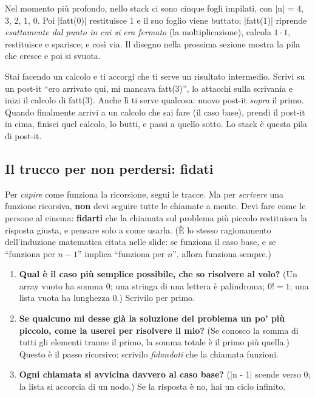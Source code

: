 Nel momento più profondo, nello stack ci sono cinque fogli impilati, con
\cc|n| = 4, 3, 2, 1, 0. Poi \cc|fatt(0)| restituisce 1 e il suo foglio viene
buttato; \cc|fatt(1)| riprende \emph{esattamente dal punto in cui si era fermato}
(la moltiplicazione), calcola $1 \cdot 1$, restituisce e sparisce; e così via. Il
disegno nella prossima sezione mostra la pila che cresce e poi si svuota.

\begin{analogia}
Stai facendo un calcolo e ti accorgi che ti serve un risultato intermedio. Scrivi
su un post-it ``ero arrivato qui, mi mancava fatt(3)'', lo attacchi sulla
scrivania e inizi il calcolo di fatt(3). Anche lì ti serve qualcosa: nuovo post-it
\emph{sopra} il primo. Quando finalmente arrivi a un calcolo che sai fare (il caso
base), prendi il post-it in cima, finisci quel calcolo, lo butti, e passi a quello
sotto. Lo stack è questa pila di post-it.
\end{analogia}

\subsection*{Il trucco per non perdersi: fidati}

Per \emph{capire} come funziona la ricorsione, segui le tracce. Ma per
\emph{scrivere} una funzione ricorsiva, \textbf{non} devi seguire tutte le
chiamate a mente. Devi fare come le persone al cinema: \textbf{fidarti} che la
chiamata sul problema più piccolo restituisca la risposta giusta, e pensare solo a
come usarla. (È lo stesso ragionamento dell'induzione matematica citata nelle
slide: se funziona il caso base, e se ``funziona per $n-1$'' implica ``funziona
per $n$'', allora funziona sempre.)

\begin{passopasso}
\begin{enumerate}
  \item \textbf{Qual è il caso più semplice possibile, che so risolvere al volo?}
        (Un array vuoto ha somma 0; una stringa di una lettera è palindroma; $0! = 1$;
        una lista vuota ha lunghezza 0.) Scrivilo per primo.
  \item \textbf{Se qualcuno mi desse già la soluzione del problema un po' più
        piccolo, come la userei per risolvere il mio?} (Se conosco la somma di tutti
        gli elementi tranne il primo, la somma totale è il primo più quella.) Questo
        è il passo ricorsivo: scrivilo \emph{fidandoti} che la chiamata funzioni.
  \item \textbf{Ogni chiamata si avvicina davvero al caso base?} (\cc|n - 1| scende
        verso 0; la lista si accorcia di un nodo.) Se la risposta è no, hai un ciclo
        infinito.
\end{enumerate}
\end{passopasso}

